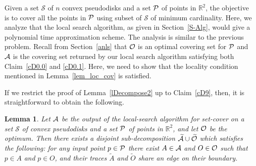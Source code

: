 \documentclass[a4paper,11pt]{article}
\newcommand{\IR}{\mathbb{R}}
\newtheorem{lemma}{Lemma}
\begin{document}
 Given a set  $\mathscr{S}$ of $n$ convex  pseudodisks and a set $\cal P$ of points in $\IR^2$, the objective is to cover all the points in $\cal P$ using subset of $\mathscr{S}$ of minimum cardinality.
Here, we analyze that the local search algorithm, as given in Section~\ref{S-Alg}, would give a polynomial time approximation scheme. 
The analysis is similar to the previous problem. 
Recall from Section~\ref{anls} that   ${\cal O}$ is an optimal covering set for $\cal P$ and ${\cal A}$ 
is  the covering set returned by our local search algorithm satisfying both  Claim~\ref{cD0.0} and \ref{cD0.1}. 
Here, we need to show that the locality condition mentioned in 
Lemma~\ref{lem_loc_cov}  is satisfied.

If we restrict the proof  of Lemma~\ref{lDecompose2} up to Claim~\ref{cD9}, then, it is straightforward to obtain the following.


\begin{lemma}\label{set_cover}
Let ${\cal A}$ be the output of the local-search algorithm for set-cover on a set $\mathscr{S}$ of 
convex  pseudodisks and a set $\cal P$ 
of points in 
$\IR^2$,  and let   ${\cal O}$ be the optimum. 
Then  there exists a 
disjoint sub-decomposition  $\widetilde{\cal A}\cup \widetilde{\cal O}$ 
which 
satisfies the following: for any input point $p\in {\cal P}$  
 there exist 
 ${A}\in {\cal A}$ and 
${O}\in{\cal O}$ such that  $p\in {A}$ and $p \in {O}$, and their traces
$\widetilde{A}$ and $\widetilde{O}$  share an edge on their boundary.
\end{lemma}
\end{document}
